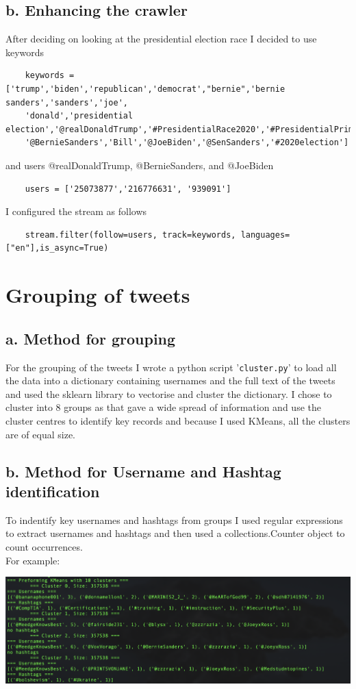 \documentclass[10pt,a4paper]{article}
\begin{document}
	\subsection*{b. Enhancing the crawler} 
	After deciding on looking at the presidential election race I decided to use keywords
	\begin{verbatim}
	keywords = ['trump','biden','republican','democrat',"bernie",'bernie sanders','sanders','joe',
	'donald','presidential election','@realDonaldTrump','#PresidentialRace2020','#PresidentialPrimary',
	'@BernieSanders','Bill','@JoeBiden','@SenSanders','#2020election']
	\end{verbatim}
	and users  @realDonaldTrump, @BernieSanders, and @JoeBiden
	\begin{verbatim}
	users = ['25073877','216776631', '939091']
	\end{verbatim}
	I configured the stream as follows
	\begin{verbatim}
	stream.filter(follow=users, track=keywords, languages=["en"],is_async=True)
	\end{verbatim}
	
\section{Grouping of tweets}
	\subsection*{a. Method for grouping}
	For the grouping of the tweets I wrote a python script '\verb|cluster.py|' to load all the data into a dictionary containing usernames and the full text of the tweets and used the sklearn library to vectorise and cluster the dictionary.
	I chose to cluster into 8 groups as that gave a wide spread of information and use the cluster centres to identify key records and because I used KMeans, all the clusters are of equal size.
	\subsection*{b. Method for Username and Hashtag identification}
	To indentify key usernames and hashtags from groups I used regular expressions to extract usernames and hashtags and then used a collections.Counter object to count occurrences. \\
	For example:
	
\includegraphics[width=\textwidth]{images/cluster_example.png} 
\end{document}

